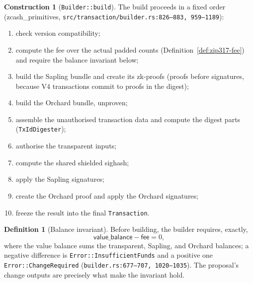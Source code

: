 \documentclass[11pt,a4paper]{article}
\theoremstyle{definition}
\newtheorem{definition}[theorem]{Definition}
\newtheorem{construction}[theorem]{Construction}
\begin{document}
\begin{construction}[\texttt{Builder::build}]\label{def:build-order}
The build proceeds in a fixed order (\textsf{zcash\_primitives},
\texttt{src/transaction/builder.rs:826--883, 959--1189}):
\begin{enumerate}[leftmargin=*,itemsep=1pt]
\item check version compatibility;
\item compute the fee over the actual padded counts
(Definition~\ref{def:zip317-fee}) and require the balance invariant below;
\item build the Sapling bundle and create its zk-proofs (proofs before
signatures, because V4 transactions commit to proofs in the digest);
\item build the Orchard bundle, unproven;
\item assemble the unauthorised transaction data and compute the digest
parts (\texttt{TxIdDigester});
\item authorise the transparent inputs;
\item compute the shared shielded sighash;
\item apply the Sapling signatures;
\item create the Orchard proof and apply the Orchard signatures;
\item freeze the result into the final \texttt{Transaction}.
\end{enumerate}
\end{construction}

\begin{definition}[Balance invariant]\label{def:balance-invariant}
Before building, the builder requires, exactly,
\[
\mathsf{value\_balance} - \mathsf{fee} = 0,
\]
where the value balance sums the transparent, Sapling, and Orchard balances;
a negative difference is \texttt{Error::InsufficientFunds} and a positive
one \texttt{Error::ChangeRequired}
(\texttt{builder.rs:677--707, 1020--1035}). The proposal's change outputs
are precisely what make the invariant hold.
\end{definition}
\end{document}
